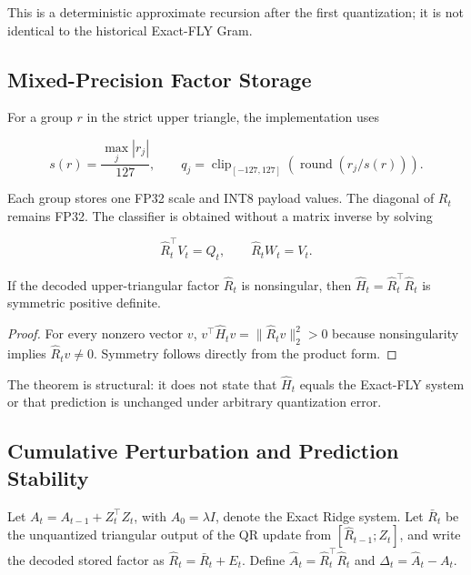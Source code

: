 \documentclass[runningheads]{llncs}
\begin{document}
This is a deterministic approximate recursion after the first quantization; it
is not identical to the historical Exact-FLY Gram.

\subsection{Mixed-Precision Factor Storage}

For a group $r$ in the strict upper triangle, the implementation uses

\begin{equation}
s(r)=\frac{\max_j|r_j|}{127},\qquad
q_j=\operatorname{clip}_{[-127,127]}
\left(\operatorname{round}\left(r_j/s(r)\right)\right).
\label{eq:quantization}
\end{equation}

Each group stores one FP32 scale and INT8 payload values. The diagonal of
$R_t$ remains FP32. The classifier is obtained without a matrix inverse by
solving

\begin{equation}
\widehat R_t^{\top}V_t=Q_t,\qquad
\widehat R_t W_t=V_t.
\label{eq:triangular-solve}
\end{equation}

\begin{theorem}
If the decoded upper-triangular factor $\widehat R_t$ is nonsingular, then
$\widehat H_t=\widehat R_t^{\top}\widehat R_t$ is symmetric positive definite.
\end{theorem}

\begin{proof}
For every nonzero vector $v$,
$v^{\top}\widehat H_t v=
\|\widehat R_t v\|_2^2>0$ because nonsingularity implies
$\widehat R_t v\neq 0$. Symmetry follows directly from the product form.
\end{proof}

The theorem is structural: it does not state that $\widehat H_t$ equals the
Exact-FLY system or that prediction is unchanged under arbitrary quantization
error.

\subsection{Cumulative Perturbation and Prediction Stability}

Let $A_t=A_{t-1}+Z_t^\top Z_t$, with $A_0=\lambda I$, denote the Exact
Ridge system. Let $\bar R_t$ be the unquantized triangular output of the QR
update from $[\widehat R_{t-1};Z_t]$, and write the decoded stored factor as
$\widehat R_t=\bar R_t+E_t$. Define
$\widehat A_t=\widehat R_t^\top\widehat R_t$ and
$\Delta_t=\widehat A_t-A_t$.
\end{document}
